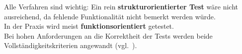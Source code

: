 \noindent
Alle Verfahren sind wichtig: Ein rein \textbf{strukturorientierter Test} wäre nicht ausreichend, da fehlende Funktionalität nicht bemerkt werden würde.\\
In der Praxis wird meist \textbf{funktionsorientiert} getestet.\\

\noindent
Bei hohen Anforderungen an die Korrektheit der Tests werden beide Vollständigkeitskriterien angewandt (vgl.~\cite[42]{Wed09c}).
